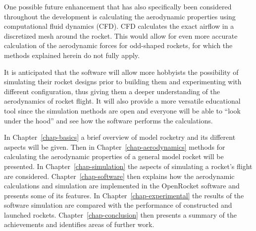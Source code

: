 One possible future enhancement that has also specifically been
considered throughout the development is calculating the aerodynamic
properties using computational fluid dynamics (CFD).  CFD calculates
the exact airflow in a discretized mesh around the rocket.  This would
allow for even more accurate calculation of the aerodynamic forces for
odd-shaped rockets, for which the methods explained herein do not
fully apply.

It is anticipated that the software will allow more hobbyists the
possibility of simulating their rocket designs prior to building them
and experimenting with different configuration, thus giving them a
deeper understanding of the aerodynamics of rocket flight.  It will
also provide a more versatile educational tool since the simulation
methods are open and everyone will be able to ``look under the hood''
and see how the software performs the calculations.

In Chapter~\ref{chap-basics} a brief overview of model rocketry and
its different aspects will be given.  Then in
Chapter~\ref{chap-aerodynamics} methods for calculating the
aerodynamic properties of a general model rocket will be presented.
In Chapter~\ref{chap-simulation} the aspects of simulating a rocket's
flight are considered.  Chapter~\ref{chap-software} then explains how
the aerodynamic calculations and simulation are implemented in the
OpenRocket software and presents some of its features.  In
Chapter~\ref{chap-experimental} the results of the software simulation
are compared with the performance of constructed and launched rockets.
Chapter~\ref{chap-conclusion} then presents a summary of the
achievements and identifies areas of further work.


